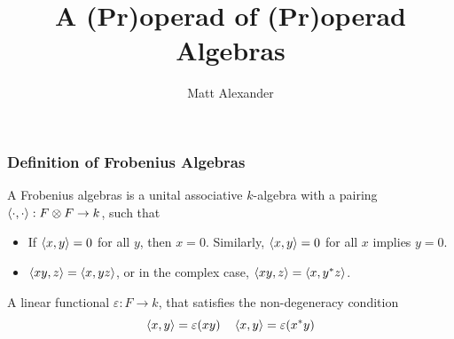 \documentclass{beamer}
\title{A (Pr)operad of (Pr)operad Algebras}
\author{Matt Alexander}
\begin{document}
\begin{frame}
\titlepage
\end{frame}













\begin{frame}

\frametitle{Definition of Frobenius Algebras}


A Frobenius algebras is a unital associative $k$-algebra with a pairing $\left\langle \cdot, \cdot \right\rangle: F \otimes F \to k$, such that

\begin{itemize}
\item {} If $\left\langle x,y \right\rangle = 0$ for all $y$, then $x = 0$. Similarly, $\left\langle x,y \right\rangle = 0$ for all $x$ implies $y=0$.

\item {} $\left\langle xy,z \right\rangle = \left\langle x,yz \right\rangle$, or in the complex case, $\left\langle xy,z \right\rangle = \left\langle x, y^* z \right\rangle$.
\end{itemize}


 A linear functional $\varepsilon: F \to k$, that satisfies the non-degeneracy condition
\begin{equation*}
\left\langle x,y \right\rangle = \varepsilon(xy) \quad \left\langle x,y \right\rangle = \varepsilon(x^* y)
\end{equation*}


\end{frame}





\end{document}

